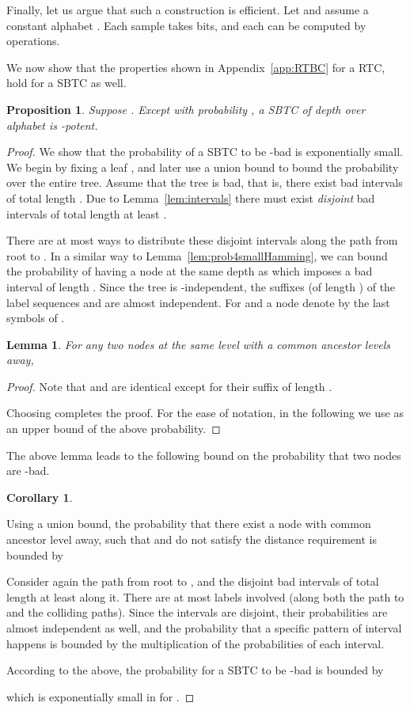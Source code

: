 \documentclass[ letterpaper, 11pt]{article}
\newtheorem{lemma}[theorem]{Lemma}
\newtheorem{proposition}[theorem]{Proposition}
\newtheorem{corollary}[theorem]{Corollary}
\newcommand{\potent}{potent\xspace}
\newcommand{\RTBC}{\textsf{RTC}\xspace}
\newcommand{\KTC}{\textsf{SBTC}\xspace}
\begin{document}
Finally, let us argue that such a construction is efficient.
Let  and assume a constant alphabet .
Each sample  takes  bits, and each  can be computed by  operations.




\bigskip
We now show that the properties shown in Appendix~\ref{app:RTBC} for a \RTBC,
hold for a \KTC as well.
\begin{proposition}\label{prop:KTCisPotent}
Suppose .
Except with probability ,
a \KTC of depth  over alphabet 
is -\potent.
\end{proposition}
\begin{proof}
We show that the probability of a \KTC to be
-bad is exponentially small.
We begin by fixing a leaf , and later use a union bound
to bound the probability over the entire tree.
Assume that the tree is bad, that is,
there exist bad intervals of total length .
Due to Lemma~\ref{lem:intervals}
there must exist \emph{disjoint}
bad intervals of total length at least .


There are at most 
ways to distribute these disjoint
intervals along the path from  root to .
In a similar way to Lemma~\ref{lem:prob4smallHamming},
we can bound the probability of  having
a node  at the same depth as  which imposes a bad interval of length .
Since the tree is -independent,
the suffixes (of length ) of the label sequences  and  are almost independent.
For  and a node   denote by  the last  symbols of .
\begin{lemma}\label{lem:ktcHD}
For any two nodes at the same level  with a common ancestor  levels
away,

\end{lemma}
\begin{proof}
Note that  and  are identical except for their suffix of length .

Choosing  completes the proof.
For the ease of notation, in the following we use  as an upper bound of the above probability.
\end{proof}
The above lemma leads to the following bound on the probability that two nodes are -bad.
\begin{corollary}\label{cor:defect}

\end{corollary}
\noindent Using a union bound, the probability that there exist a node
 with common ancestor  level away, such that
 and  do not satisfy the distance requirement is bounded by


Consider again the path from root to , and the disjoint
bad intervals of total length at least  along it.
There are at most  labels involved (along both the path to  and the colliding paths).
Since the intervals are disjoint, their probabilities are almost independent as well, and
the probability that a specific pattern of interval happens is bounded by the
multiplication of the probabilities of each interval.


According to the above, 
the probability for a \KTC to be -bad is bounded by

which is exponentially small in  for .
\end{proof}
\end{document}
